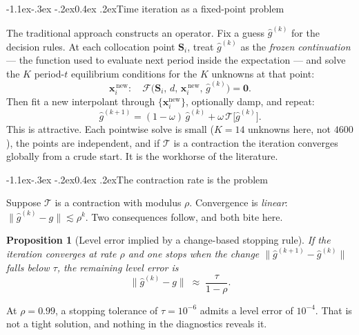 \documentclass[10pt,a4paper]{article}
\makeatletter
\theoremstyle{definition}
\theoremstyle{plain}
\newtheorem{prop}[defn]{Proposition}
\theoremstyle{remark}
\newcommand{\st}{\mathbf{S}}
\newcommand{\unk}{\mathbf{x}}
\renewcommand\subsection{\@startsection{subsection}{2}{\z@}%
  {-1.1ex\@plus -.3ex \@minus -.2ex}{0.4ex \@plus .2ex}{\normalfont\normalsize\bfseries}}
\makeatother
\begin{document}
\subsection{Time iteration as a fixed-point problem}

The traditional approach constructs an operator. Fix a guess $\hat g^{(k)}$ for the decision
rules. At each collocation point $\st_i$, treat $\hat g^{(k)}$ as the \emph{frozen
continuation} --- the function used to evaluate next period inside the expectation --- and
solve the $K$ period-$t$ equilibrium conditions for the $K$ unknowns at that point:
\begin{equation}
  \unk_i^{\,\text{new}} : \quad \mathcal{F}\big(\st_i,\,d,\,\unk_i^{\,\text{new}},\,\hat g^{(k)}\big) = \bm 0 .
  \label{eq:timeiter}
\end{equation}
Then fit a new interpolant through $\{\unk_i^{\text{new}}\}$, optionally damp, and repeat:
\begin{equation}
  \hat g^{(k+1)} = (1-\omega)\,\hat g^{(k)} + \omega\,\mathcal{T}\!\big[\hat g^{(k)}\big].
\end{equation}
This is attractive. Each pointwise solve is small ($K=14$ unknowns here, not $4600$), the
points are independent, and if $\mathcal{T}$ is a contraction the iteration converges globally
from a crude start. It is the workhorse of the literature.

\subsection{The contraction rate is the problem}

Suppose $\mathcal{T}$ is a contraction with modulus $\rho$. Convergence is \emph{linear}:
$\|\hat g^{(k)} - g\| \lesssim \rho^{k}$. Two consequences follow, and both bite here.

\begin{prop}[Level error implied by a change-based stopping rule]
\label{prop:stall}
If the iteration converges at rate $\rho$ and one stops when the \emph{change}
$\|\hat g^{(k+1)}-\hat g^{(k)}\|$ falls below $\tau$, the remaining \emph{level} error is
\begin{equation}
  \|\hat g^{(k)} - g\| \;\approx\; \frac{\tau}{1-\rho}.
\end{equation}
\end{prop}
\noindent At $\rho = 0.99$, a stopping tolerance of $\tau=10^{-6}$ admits a level error of
$10^{-4}$. That is not a tight solution, and nothing in the diagnostics reveals it.
\end{document}
